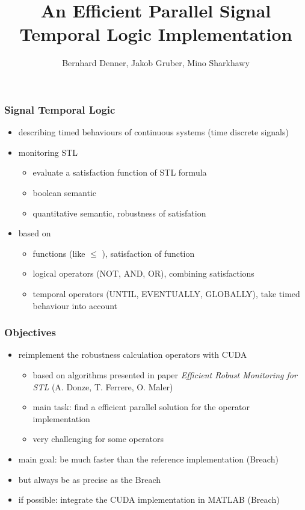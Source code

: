 \documentclass{beamer}
\title{An Efficient Parallel Signal Temporal Logic Implementation}
\author{
	Bernhard Denner,
	Jakob Gruber,
	Mino Sharkhawy
}
\begin{document}
\maketitle

\begin{frame}
\frametitle{Signal Temporal Logic}
\begin{itemize}
    \item describing timed behaviours of continuous systems (time discrete signals)
    \item monitoring STL 
          \begin{itemize}
        	\item evaluate a satisfaction function of STL formula
        	\item boolean semantic
        	\item quantitative semantic, robustness of satisfation
          \end{itemize}
    \item based on
          \begin{itemize}
        	\item functions (like $\leq$ ), satisfaction of function
        	\item logical operators (NOT, AND, OR), combining satisfactions
        	\item temporal operators (UNTIL, EVENTUALLY, GLOBALLY), take timed behaviour into account
          \end{itemize}
\end{itemize}
\end{frame}

\begin{frame}
\frametitle{Objectives}
\begin{itemize}
	\item reimplement the robustness calculation operators with CUDA
	\begin{itemize}
	    \item based on algorithms presented in paper \emph{Efficient Robust Monitoring for STL} (A. Donze, T. Ferrere, O. Maler)
	    \item main task: find a efficient parallel solution for the operator implementation
	    \item very challenging for some operators
    \end{itemize}
	\item main goal: be much faster than the reference implementation (Breach)
	\item but always be as precise as the Breach
	\item if possible: integrate the CUDA implementation in MATLAB (Breach)
\end{itemize}
\end{frame}
\end{document}
